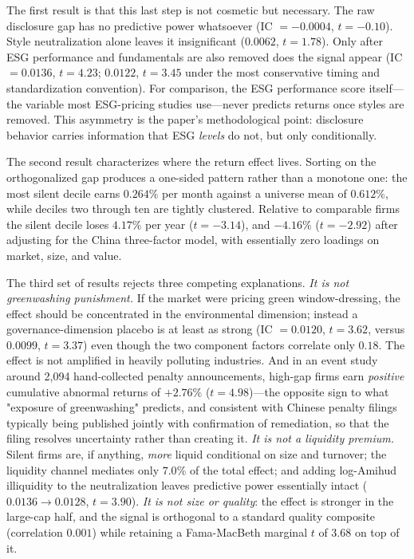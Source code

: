 \documentclass[12pt]{article}
\begin{document}
The first result is that this last step is not cosmetic but necessary. The raw
disclosure gap has no predictive power whatsoever (IC $=-0.0004$, $t=-0.10$).
Style neutralization alone leaves it insignificant ($0.0062$, $t=1.78$). Only
after ESG performance and fundamentals are also removed does the signal appear
(IC $=0.0136$, $t=4.23$; $0.0122$, $t=3.45$ under the most conservative timing
and standardization convention). For comparison, the ESG performance score
itself---the variable most ESG-pricing studies use---never predicts returns
once styles are removed. This asymmetry is the paper's methodological point:
disclosure behavior carries information that ESG \emph{levels} do not, but only
conditionally.

The second result characterizes where the return effect lives. Sorting on the
orthogonalized gap produces a one-sided pattern rather than a monotone one: the
most silent decile earns $0.264\%$ per month against a universe mean of
$0.612\%$, while deciles two through ten are tightly clustered. Relative to
comparable firms the silent decile loses $4.17\%$ per year ($t=-3.14$), and
$-4.16\%$ ($t=-2.92$) after adjusting for the \citet{liu2019} China three-factor
model, with essentially zero loadings on market, size, and value.

The third set of results rejects three competing explanations. \emph{It is not
greenwashing punishment.} If the market were pricing green window-dressing, the
effect should be concentrated in the environmental dimension; instead a
governance-dimension placebo is at least as strong (IC $=0.0120$, $t=3.62$,
versus $0.0099$, $t=3.37$) even though the two component factors correlate only
$0.18$. The effect is not amplified in heavily polluting industries. And in an
event study around 2{,}094 hand-collected penalty announcements, high-gap firms
earn \emph{positive} cumulative abnormal returns of $+2.76\%$ ($t=4.98$)---the
opposite sign to what "exposure of greenwashing" predicts, and consistent with
Chinese penalty filings typically being published jointly with confirmation of
remediation, so that the filing resolves uncertainty rather than creating it.
\emph{It is not a liquidity premium.} Silent firms are, if anything,
\emph{more} liquid conditional on size and turnover; the liquidity channel
mediates only $7.0\%$ of the total effect; and adding log-Amihud illiquidity to
the neutralization leaves predictive power essentially intact ($0.0136 \to
0.0128$, $t=3.90$). \emph{It is not size or quality}: the effect is stronger in
the large-cap half, and the signal is orthogonal to a standard quality
composite (correlation $0.001$) while retaining a Fama-MacBeth marginal
$t$ of $3.68$ on top of it.
\end{document}
